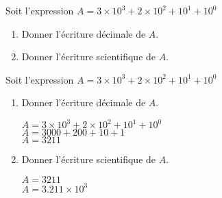\begin{exercice*}
    Soit l'expression $A=3\times 10^3 + 2\times 10^2 + 10^1 + 10^0$
    \begin{enumerate}    
        \item Donner l'écriture décimale de $A$.
        \item Donner l'écriture scientifique de $A$.
    \end{enumerate}    
\end{exercice*}
\begin{corrige}
    Soit l'expression $A=3\times 10^3 + 2\times 10^2 + 10^1 + 10^0$
    \begin{enumerate}    
        \item Donner l'écriture décimale de $A$.
        
        {\red 
            $A=3\times 10^3 + 2\times 10^2 + 10^1 + 10^0$\\
            $A=\num{3000} + 200 + 10 + 1$\\
            $A=\num{3211}$
        }
        \item Donner l'écriture scientifique de $A$.
        
        {\red 
            $A=\num{3211}$\\
            $A=\num{3.211}\times 10^3$
        }
    \end{enumerate}  
\end{corrige}

